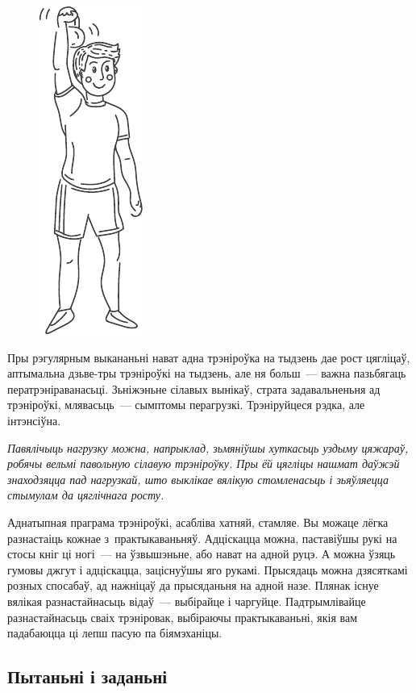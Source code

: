 \begin{figure}[htb!]
  \centering
  \includegraphics[scale=1.5]{willpower/ch5/10.pdf}
\end{figure}

Пры рэгулярным выкананьні нават адна трэніроўка на тыдзень дае рост цягліцаў, аптымальна дзьве-тры трэніроўкі на тыдзень, але ня больш~--- важна пазьбягаць ператрэніраванасьці. Зьніжэньне сілавых вынікаў, страта задавальненьня ад трэніроўкі, млявасьць~--- сымптомы перагрузкі. Трэніруйцеся рэдка, але інтэнсіўна.

\emph{Павялічыць нагрузку можна, напрыклад, зьмяніўшы хуткасьць уздыму цяжараў, робячы вельмі павольную сілавую трэніроўку. Пры ёй цягліцы нашмат даўжэй знаходзяцца пад нагрузкай, што выклікае вялікую стомленасьць і зьяўляецца стымулам да цяглічнага росту.}

Аднатыпная праграма трэніроўкі, асабліва хатняй, стамляе. Вы можаце лёгка разнастаіць кожнае з~практыкаваньняў. Адціскацца можна, паставіўшы рукі на стосы кніг ці ногі~--- на ўзвышэньне, або нават на адной руцэ. А можна ўзяць гумовы джгут і адціскацца, заціснуўшы яго рукамі. Прысядаць можна дзясяткамі розных спосабаў, ад нажніцаў да прысяданьня на адной назе. Плянак існуе вялікая разнастайнасьць відаў~--- выбірайце і чаргуйце. Падтрымлівайце разнастайнасьць сваіх трэніровак, выбіраючы практыкаваньні, якія вам падабаюцца ці лепш пасую па біямэханіцы.

\subsection*{Пытаньні і заданьні}

